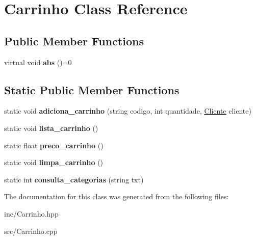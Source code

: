\hypertarget{class_carrinho}{}\section{Carrinho Class Reference}
\label{class_carrinho}
\subsection*{Public Member Functions}
\begin{DoxyCompactItemize}
\item 
virtual void {\bfseries abs} ()=0\hypertarget{class_carrinho_a77499e1a5037ddc9acc72a00914b8643}{}\label{class_carrinho_a77499e1a5037ddc9acc72a00914b8643}

\end{DoxyCompactItemize}
\subsection*{Static Public Member Functions}
\begin{DoxyCompactItemize}
\item 
static void {\bfseries adiciona\+\_\+carrinho} (string codigo, int quantidade, \hyperlink{class_cliente}{Cliente} cliente)\hypertarget{class_carrinho_ade1cedd5c03d2c9a806bd338c9d00f21}{}\label{class_carrinho_ade1cedd5c03d2c9a806bd338c9d00f21}

\item 
static void {\bfseries lista\+\_\+carrinho} ()\hypertarget{class_carrinho_a73455a76c902d02a5738e44c7a298718}{}\label{class_carrinho_a73455a76c902d02a5738e44c7a298718}

\item 
static float {\bfseries preco\+\_\+carrinho} ()\hypertarget{class_carrinho_a4562f5b856114cab4e1753009016f6ce}{}\label{class_carrinho_a4562f5b856114cab4e1753009016f6ce}

\item 
static void {\bfseries limpa\+\_\+carrinho} ()\hypertarget{class_carrinho_a4b17446813124b68ebf1746a6091afe4}{}\label{class_carrinho_a4b17446813124b68ebf1746a6091afe4}

\item 
static int {\bfseries consulta\+\_\+categorias} (string txt)\hypertarget{class_carrinho_a2a99004889b3fbe6d94784ee478608c4}{}\label{class_carrinho_a2a99004889b3fbe6d94784ee478608c4}

\end{DoxyCompactItemize}


The documentation for this class was generated from the following files\+:\begin{DoxyCompactItemize}
\item 
inc/Carrinho.\+hpp\item 
src/Carrinho.\+cpp\end{DoxyCompactItemize}
